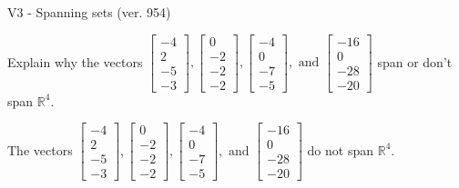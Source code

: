 \begin{exercise}
  \begin{exerciseTitle}V3 - Spanning sets (ver. 954)\end{exerciseTitle}
  \begin{exerciseStatement}
    Explain why the vectors \(\left[\begin{array}{r}
-4 \\
2 \\
-5 \\
-3
\end{array}\right] , \left[\begin{array}{r}
0 \\
-2 \\
-2 \\
-2
\end{array}\right] , \left[\begin{array}{r}
-4 \\
0 \\
-7 \\
-5
\end{array}\right] , \text{ and } \left[\begin{array}{r}
-16 \\
0 \\
-28 \\
-20
\end{array}\right]\) span or don't span \(\mathbb{R}^4\). 
	


  \end{exerciseStatement}
  \begin{exerciseAnswer}
   The vectors \(\left[\begin{array}{r}
-4 \\
2 \\
-5 \\
-3
\end{array}\right] , \left[\begin{array}{r}
0 \\
-2 \\
-2 \\
-2
\end{array}\right] , \left[\begin{array}{r}
-4 \\
0 \\
-7 \\
-5
\end{array}\right] , \text{ and } \left[\begin{array}{r}
-16 \\
0 \\
-28 \\
-20
\end{array}\right]\) 
  	 do not  
	span \(\mathbb{R}^4\).
  


  \end{exerciseAnswer}
\end{exercise}